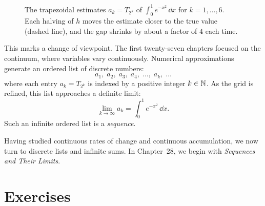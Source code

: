\begin{figure}[htbp]
\centering
{}
\caption{The trapezoidal estimates $a_k = T_{2^k}$ of $\int_0^1 e^{-x^2}\,\dd x$ for $k=1,\dots,6$. Each halving of $h$ moves the estimate closer to the true value (dashed line), and the gap shrinks by about a factor of $4$ each time.}
\label{ch27:fig-seq}
\end{figure}

This marks a change of viewpoint. The first twenty-seven chapters focused on the
continuum, where variables vary continuously. Numerical approximations generate an ordered
list of discrete numbers:
\[
  a_1,\; a_2,\; a_3,\; a_4,\; \dots,\; a_k,\; \dots
\]
where each entry $a_k = T_{2^k}$ is indexed by a positive integer $k \in \mathbb{N}$. As the grid
is refined, this list approaches a definite limit:
\[
  \lim_{k \to \infty} a_k = \int_0^1 e^{-x^2}\,\dd x.
\]
Such an infinite ordered list is a \emph{sequence}.

Having studied continuous rates of change and continuous accumulation, we now turn to
discrete lists and infinite sums. In Chapter~28, we begin with \emph{Sequences and Their Limits}.

\section{Exercises}
\label{ch27:exercises}

